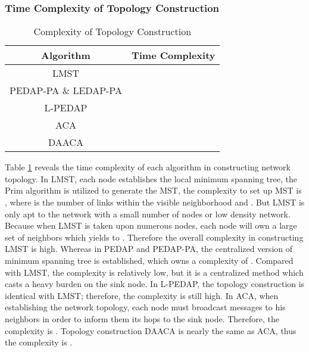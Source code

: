 \documentclass{elsarticle}
\begin{document}
\subsubsection{Time Complexity of Topology Construction} \label{ComplexityofTopologyConstruction}
\begin{table}[!hbp]
\centering
\caption{Complexity of Topology Construction} \label{ComplexityOfTopologyConstructionTable}
\begin{tabular}{cc}
\toprule
\textbf{Algorithm} & \textbf{Time Complexity} \\
\midrule
LMST &  \\
PEDAP-PA \& LEDAP-PA &  \\
L-PEDAP &  \\
ACA &  \\
DAACA &  \\
\bottomrule
\end{tabular}

\end{table}

Table \ref{ComplexityOfTopologyConstructionTable} reveals the time complexity of each algorithm in constructing network topology. In LMST, each node establishes the local minimum spanning tree, the Prim algorithm is utilized to generate the MST, the complexity to set up MST is , where  is the number of links within the visible neighborhood \cite{label-8} and . But LMST is only apt to the network with a small number of nodes or low density network. Because when LMST is taken upon numerous nodes, each node will own a large set of neighbors which yields to . Therefore the overall complexity in constructing LMST is high. Whereas in PEDAP and PEDAP-PA, the centralized version of minimum spanning tree is established, which owns a complexity of . Compared with LMST, the complexity is relatively low, but it is a centralized method which casts a heavy burden on the sink node. In L-PEDAP, the topology construction is identical with LMST; therefore, the complexity is still high. In ACA, when establishing the network topology, each node must broadcast messages to his neighbors in order to inform them its hops to the sink node. Therefore, the complexity is . Topology construction DAACA is nearly the same as ACA, thus the complexity is .
\end{document}
